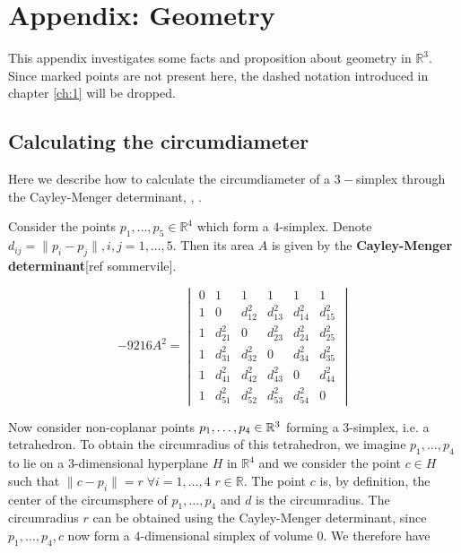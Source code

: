 \appendix

\chapter{Appendix: Geometry}\label{appendix}
This appendix investigates some facts and proposition about geometry in $\mathbb R^3$. Since marked points are not present here, the dashed notation introduced in chapter \ref{ch:1} will be dropped.

\section{Calculating the circumdiameter}
Here we describe how to calculate the circumdiameter of a $3-$simplex through the Cayley-Menger determinant\cite{Cayley1841}, \cite{Menger28}, \cite{Uspensky48} .

Consider the points $p_1,\dots, p_5 \in \mathbb R^4$ which form a $4$-simplex. Denote $d_{ij} = \|p_i - p_j\|, i,j=1,\dots,5$. Then its area $A$ is given by the \textbf{Cayley-Menger determinant}[ref sommervile]. 

$$
-9216 A^2 =
\begin{vmatrix}
0 & 1 & 1 & 1 & 1 & 1 \\
1 & 0 & d^2_{12} & d^2_{13} & d^2_{14} & d^2_{15} \\
1 & d^2_{21} & 0 & d^2_{23} & d^2_{24} & d^2_{25}  \\
1 & d^2_{31} & d^2_{32} & 0 & d^2_{34} & d^2_{35} \\ 
1 & d^2_{41} & d^2_{42} & d^2_{43} & 0 & d^2_{44} \\
1 & d^2_{51} & d^2_{52} & d^2_{53} & d^2_{54} & 0 
\end{vmatrix} 
$$

Now consider non-coplanar points $p_1,\dots, p_4 \in {\mathbb R^3}$ forming a $3$-simplex, i.e. a tetrahedron. To obtain the circumradius of this tetrahedron, we imagine $p_1,\dots, p_4$ to lie on a $3$-dimensional hyperplane $H$ in $\mathbb R^4$ and we consider the point $c \in H$ such that $\|c-p_i\| = r \;\forall i=1,\dots,4$ $r\in \mathbb R$. The point $c$ is, by definition, the center of the circumsphere of $p_1,\dots,p_4$ and $d$ is the circumradius. The circumradius $r$ can be obtained using the Cayley-Menger determinant, since $p_1,\dots,p_4,c$ now form a $4$-dimensional simplex of volume $0$. We therefore have 


